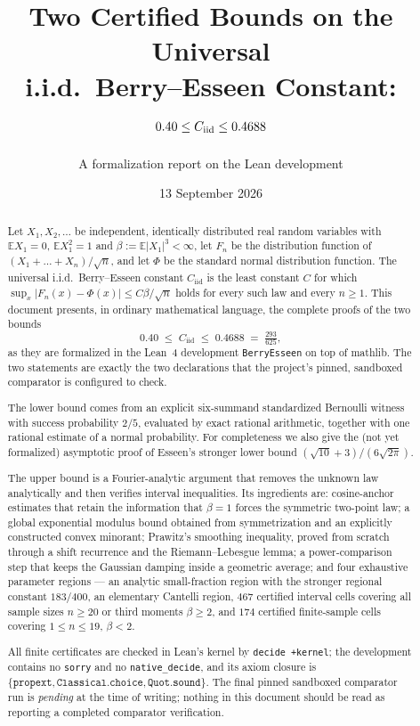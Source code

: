 \documentclass[10pt,a4paper]{article}
\title{\bf Two Certified Bounds on the Universal\\ i.i.d.\ Berry--Esseen Constant:\\[2mm]
\large $0.40 \le \Cii \le 0.4688$}
\author{A formalization report on the \file{BerryEsseen} Lean development}
\date{13 September 2026}
\theoremstyle{plain}
\theoremstyle{definition}
\newcommand{\E}{\mathbb{E}}
\newcommand{\Cii}{C_{\mathrm{iid}}}
\newcommand{\lean}[1]{\texttt{#1}}
\newcommand{\file}[1]{\texttt{#1}}
\begin{document}
\maketitle

\begin{abstract}
\noindent
Let $X_1,X_2,\dots$ be independent, identically distributed real random
variables with $\E X_1=0$, $\E X_1^2=1$ and $\beta:=\E|X_1|^3<\infty$, let
$F_n$ be the distribution function of $(X_1+\dots+X_n)/\sqrt n$, and let
$\Phi$ be the standard normal distribution function. The universal i.i.d.\
Berry--Esseen constant $\Cii$ is the least constant $C$ for which
$\sup_x|F_n(x)-\Phi(x)|\le C\beta/\sqrt n$ holds for every such law and every
$n\ge1$. This document presents, in ordinary mathematical language, the
complete proofs of the two bounds
\[
  0.40 \;\le\; \Cii \;\le\; 0.4688 \;=\; \tfrac{293}{625},
\]
as they are formalized in the Lean~4 development \file{BerryEsseen} on top of
mathlib. The two statements are exactly the two declarations that the
project's pinned, sandboxed comparator is configured to check.

The lower bound comes from an explicit six-summand standardized Bernoulli
witness with success probability $2/5$, evaluated by exact rational
arithmetic, together with one rational estimate of a normal probability. For
completeness we also give the (not yet formalized) asymptotic proof of
Esseen's stronger lower bound $(\sqrt{10}+3)/(6\sqrt{2\pi})$.

The upper bound is a Fourier-analytic argument that removes the unknown law
analytically and then verifies interval inequalities. Its ingredients are:
cosine-anchor estimates that retain the information that $\beta=1$ forces the
symmetric two-point law; a global exponential modulus bound obtained from
symmetrization and an explicitly constructed convex minorant; Prawitz's
smoothing inequality, proved from scratch through a shift recurrence and the
Riemann--Lebesgue lemma; a power-comparison step that keeps the Gaussian
damping inside a geometric average; and four exhaustive parameter regions ---
an analytic small-fraction region with the stronger regional constant
$183/400$, an elementary Cantelli region, $467$ certified interval cells
covering all sample sizes $n\ge20$ or third moments $\beta\ge2$, and $174$
certified finite-sample cells covering $1\le n\le19$, $\beta<2$.

All finite certificates are checked in Lean's kernel by \lean{decide +kernel};
the development contains no \lean{sorry} and no \lean{native\_decide}, and its
axiom closure is $\{\lean{propext},\lean{Classical.choice},\lean{Quot.sound}\}$.
The final pinned sandboxed comparator run is \emph{pending} at the time of
writing; nothing in this document should be read as reporting a completed
comparator verification.
\end{abstract}
\end{document}
